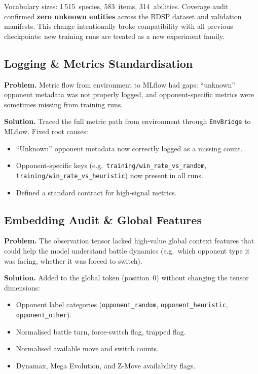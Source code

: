 Vocabulary sizes: 1\,515~species, 583~items, 314~abilities.
Coverage audit confirmed \textbf{zero unknown entities} across the BDSP
dataset and validation manifests.  This change intentionally broke
compatibility with all previous checkpoints: new training runs are treated as
a new experiment family.

\subsection{Logging \& Metrics Standardisation}

\textbf{Problem.} Metric flow from environment to MLflow had gaps:
``unknown'' opponent metadata was not properly logged, and opponent-specific
metrics were sometimes missing from training runs.

\textbf{Solution.} Traced the full metric path from environment through
\texttt{EnvBridge} to MLflow.  Fixed root causes:
\begin{itemize}
  \item ``Unknown'' opponent metadata now correctly logged as a missing count.
  \item Opponent-specific keys (e.g.\
        \texttt{training/win\_rate\_vs\_random},
        \texttt{training/win\_rate\_vs\_heuristic}) now present in all runs.
  \item Defined a standard contract for high-signal metrics.
\end{itemize}

\subsection{Embedding Audit \& Global Features}

\textbf{Problem.} The observation tensor lacked high-value global context
features that could help the model understand battle dynamics (e.g.\ which
opponent type it was facing, whether it was forced to switch).

\textbf{Solution.} Added to the global token (position~0) without changing
the tensor dimensions:
\begin{itemize}
  \item Opponent label categories (\texttt{opponent\_random},
        \texttt{opponent\_heuristic}, \texttt{opponent\_other}).
  \item Normalised battle turn, force-switch flag, trapped flag.
  \item Normalised available move and switch counts.
  \item Dynamax, Mega Evolution, and Z-Move availability flags.
\end{itemize}

